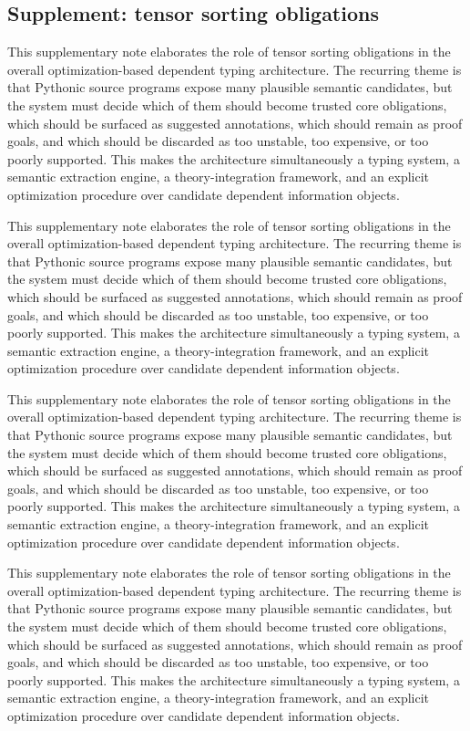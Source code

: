 \documentclass[11pt]{article}
\theoremstyle{definition}
\theoremstyle{plain}
\begin{document}
\subsection{Supplement: tensor sorting obligations}
This supplementary note elaborates the role of tensor sorting obligations in the overall
optimization-based dependent typing architecture. The recurring theme is that
Pythonic source programs expose many plausible semantic candidates, but the
system must decide which of them should become trusted core obligations, which
should be surfaced as suggested annotations, which should remain as proof
goals, and which should be discarded as too unstable, too expensive, or too
poorly supported. This makes the architecture simultaneously a typing system,
a semantic extraction engine, a theory-integration framework, and an explicit
optimization procedure over candidate dependent information objects.

This supplementary note elaborates the role of tensor sorting obligations in the overall
optimization-based dependent typing architecture. The recurring theme is that
Pythonic source programs expose many plausible semantic candidates, but the
system must decide which of them should become trusted core obligations, which
should be surfaced as suggested annotations, which should remain as proof
goals, and which should be discarded as too unstable, too expensive, or too
poorly supported. This makes the architecture simultaneously a typing system,
a semantic extraction engine, a theory-integration framework, and an explicit
optimization procedure over candidate dependent information objects.

This supplementary note elaborates the role of tensor sorting obligations in the overall
optimization-based dependent typing architecture. The recurring theme is that
Pythonic source programs expose many plausible semantic candidates, but the
system must decide which of them should become trusted core obligations, which
should be surfaced as suggested annotations, which should remain as proof
goals, and which should be discarded as too unstable, too expensive, or too
poorly supported. This makes the architecture simultaneously a typing system,
a semantic extraction engine, a theory-integration framework, and an explicit
optimization procedure over candidate dependent information objects.

This supplementary note elaborates the role of tensor sorting obligations in the overall
optimization-based dependent typing architecture. The recurring theme is that
Pythonic source programs expose many plausible semantic candidates, but the
system must decide which of them should become trusted core obligations, which
should be surfaced as suggested annotations, which should remain as proof
goals, and which should be discarded as too unstable, too expensive, or too
poorly supported. This makes the architecture simultaneously a typing system,
a semantic extraction engine, a theory-integration framework, and an explicit
optimization procedure over candidate dependent information objects.
\end{document}
